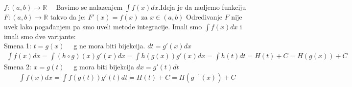 \documentclass{article}
\begin{document}
$f : (a, b) \longrightarrow \mathbb{R} \quad$ Bavimo se nalazenjem $\int f(x)dx$.\quad Ideja je da nadjemo funkciju $F:(a, b) \longrightarrow \mathbb{R}$ takvo da je:
$F'(x) =f(x)$ za $x \in (a, b)$\quad
Određivanje $F$ nije uvek lako pogađanjem pa smo uveli metode integracije.
Imali smo $\int f(x)dx$ i imali smo dve varijante:\\
Smena 1: $t = g(x)\quad$ g ne mora biti bijekcija. \quad
$dt = g'(x)dx$\\
\begin{align*}
    \int f(x)dx  = \int (h \circ g)(x)g'(x)dx = \int h(g(x))g'(x)dx
    = \int h(t)dt = H(t) + C = H(g(x)) + C
\end{align*}
Smena 2: $x = g(t)\quad$ g mora biti bijekcija \quad\quad
$dx = g'(t)dt$\\
\begin{align*}
    \int f(x) dx = \int f(g(t))g'(t)dt = H(t) + C = H(g^{-1}(x)) + C
\end{align*}
\end{document}
